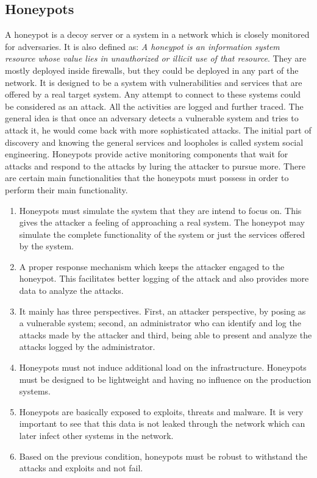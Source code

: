 \documentclass[article,msc=informatik,type=msc,colorback,accentcolor=tud9c]{tudthesis}
\begin{document}
     
	\subsection{Honeypots} \label{Honeypots}


	A honeypot  is a decoy server or a system in a network which is closely monitored for adversaries. It is also defined as:
	\textit{A honeypot \cite{spitzner2003honeypots}  is an information system resource whose value lies in unauthorized or illicit use of that resource}. They are mostly deployed inside firewalls, but they could be deployed in any part of the network. It is designed to be a system with vulnerabilities and services that are offered by a real target system. Any attempt to connect to these systems could be considered as an attack. All the activities are logged and further traced. The general idea is that once an adversary detects a vulnerable system and tries to attack it, he would come back with more sophisticated attacks. The initial part of discovery and knowing the general services and loopholes is called system social engineering.
	Honeypots provide active monitoring components that wait for attacks and respond to the attacks by luring the attacker to pursue more.
	\vspace{5mm} 
	There are certain main functionalities that the honeypots must possess in order to perform their main functionality. 

	\begin{enumerate}
	\item Honeypots must simulate the system that they are intend to focus on. This gives the attacker a feeling of approaching a real system. The honeypot may simulate the complete functionality of the system or just the services offered by the system. 

	\item A proper response mechanism which keeps the attacker engaged to the honeypot. This facilitates better logging of the attack and also provides more data to analyze the attacks. 

	\item It mainly has three perspectives. First, an attacker perspective, by posing as a vulnerable system; second, an administrator who can identify and log the attacks made by the attacker and third, being able to present and analyze the attacks logged by the administrator. 

	\item Honeypots must not induce additional load on the infrastructure. Honeypots must be designed to be lightweight and having no influence on the production systems. 

	\item Honeypots are basically exposed to exploits, threats and malware. It is very important to see that this data is not leaked through the network which can later infect other systems in the network.

	\item Based on the previous condition, honeypots must be robust to withstand the attacks and exploits and not fail.

	\end{enumerate}
\end{document}
